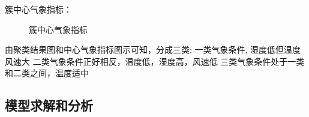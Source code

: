 \documentclass[a4paper,10pt]{my_paper}
\numberwithin{equation}{section}
\begin{document}
簇中心气象指标：
\begin{figure}[htbp]
  \caption{簇中心气象指标}\label{簇中心气象指标}
\end{figure}

由聚类结果图和中心气象指标图示可知，分成三类:
一类气象条件, 湿度低但温度风速大
二类气象条件正好相反，温度低，湿度高，风速低
三类气象条件处于一类和二类之间，温度适中


\subsection{模型求解和分析}
\end{document}
